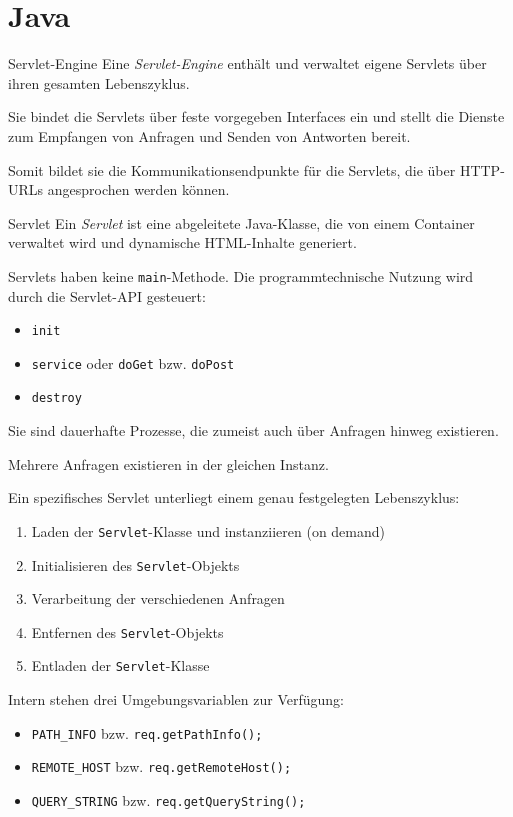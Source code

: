 \section{Java}

\begin{defi}{Servlet-Engine}
    Eine \emph{Servlet-Engine} enthält und verwaltet eigene Servlets über ihren gesamten Lebenszyklus.

    Sie bindet die Servlets über feste vorgegeben Interfaces ein und stellt die Dienste zum Empfangen von Anfragen und Senden von Antworten bereit.

    Somit bildet sie die Kommunikationsendpunkte für die Servlets, die über HTTP-URLs angesprochen werden können.
\end{defi}

\begin{defi}{Servlet}
    Ein \emph{Servlet} ist eine abgeleitete Java-Klasse, die von einem Container verwaltet wird und dynamische HTML-Inhalte generiert.

    Servlets haben keine \texttt{main}-Methode.
    Die programmtechnische Nutzung wird durch die Servlet-API gesteuert:
    \begin{itemize}
        \item \texttt{init}
        \item \texttt{service} oder \texttt{doGet} bzw. \texttt{doPost}
        \item \texttt{destroy}
    \end{itemize}

    Sie sind dauerhafte Prozesse, die zumeist auch über Anfragen hinweg existieren.

    Mehrere Anfragen existieren in der gleichen Instanz.

    Ein spezifisches Servlet unterliegt einem genau festgelegten Lebenszyklus:
    \begin{enumerate}
        \item Laden der \texttt{Servlet}-Klasse und instanziieren (on demand)
        \item Initialisieren des \texttt{Servlet}-Objekts
        \item Verarbeitung der verschiedenen Anfragen
        \item Entfernen des \texttt{Servlet}-Objekts
        \item Entladen der \texttt{Servlet}-Klasse
    \end{enumerate}

    Intern stehen drei Umgebungsvariablen zur Verfügung:
    \begin{itemize}
        \item \texttt{PATH\_INFO} bzw. \texttt{req.getPathInfo();}
        \item \texttt{REMOTE\_HOST} bzw. \texttt{req.getRemoteHost();}
        \item \texttt{QUERY\_STRING} bzw. \texttt{req.getQueryString();}
    \end{itemize}
\end{defi}

